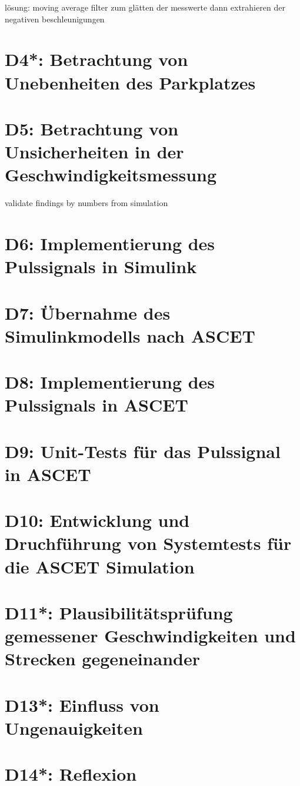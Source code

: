 lösung: moving average filter zum glätten der messwerte
dann extrahieren der negativen beschleunigungen

\chapter{D4*: Betrachtung von Unebenheiten des Parkplatzes}\label{cha:D4}

\chapter{D5: Betrachtung von Unsicherheiten in der Geschwindigkeitsmessung}\label{cha:D5}
validate findings by numbers from simulation

\chapter{D6: Implementierung des Pulssignals in Simulink}\label{cha:D6}

\chapter{D7: Übernahme des Simulinkmodells nach ASCET}\label{cha:D7}

\chapter{D8: Implementierung des Pulssignals in ASCET}\label{cha:D8}

\chapter{D9: Unit-Tests für das Pulssignal in ASCET}\label{cha:D9}

\chapter{D10: Entwicklung und Druchführung von Systemtests für die ASCET Simulation}\label{cha:D10}

\chapter{D11*: Plausibilitätsprüfung gemessener Geschwindigkeiten und  Strecken gegeneinander}\label{cha:D11}

\chapter{D13*: Einfluss von Ungenauigkeiten}\label{cha:D13}

\chapter{D14*: Reflexion}\label{cha:D14}